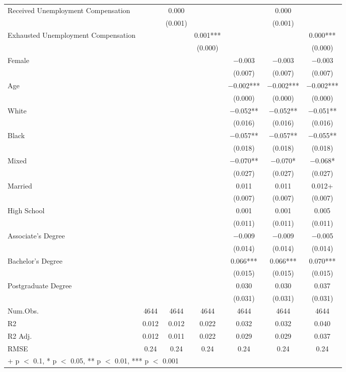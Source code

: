\documentclass[
]{article}
\begin{document}
\begin{table}
{\begin{tabular}[t]{lcccccc}
Received
Unemployment
Compensation &  & \num{0.000} &  &  & \num{0.000} & \\
 &  & (\num{0.001}) &  &  & (\num{0.001}) & \\
Exhausted
Unemployment
Compensation &  &  & \num{0.001}*** &  &  & \num{0.000}***\\
 &  &  & (\num{0.000}) &  &  & (\num{0.000})\\
Female &  &  &  & \num{-0.003} & \num{-0.003} & \num{-0.003}\\
 &  &  &  & (\num{0.007}) & (\num{0.007}) & \vphantom{1} (\num{0.007})\\
Age &  &  &  & \num{-0.002}*** & \num{-0.002}*** & \num{-0.002}***\\
 &  &  &  & (\num{0.000}) & (\num{0.000}) & (\num{0.000})\\
White &  &  &  & \num{-0.052}** & \num{-0.052}** & \num{-0.051}**\\
 &  &  &  & (\num{0.016}) & (\num{0.016}) & (\num{0.016})\\
Black &  &  &  & \num{-0.057}** & \num{-0.057}** & \num{-0.055}**\\
 &  &  &  & (\num{0.018}) & (\num{0.018}) & (\num{0.018})\\
Mixed &  &  &  & \num{-0.070}** & \num{-0.070}* & \num{-0.068}*\\
 &  &  &  & (\num{0.027}) & (\num{0.027}) & (\num{0.027})\\
Married &  &  &  & \num{0.011} & \num{0.011} & \num{0.012}+\\
 &  &  &  & (\num{0.007}) & (\num{0.007}) & (\num{0.007})\\
High
School &  &  &  & \num{0.001} & \num{0.001} & \num{0.005}\\
 &  &  &  & (\num{0.011}) & (\num{0.011}) & (\num{0.011})\\
Associate's
Degree &  &  &  & \num{-0.009} & \num{-0.009} & \num{-0.005}\\
 &  &  &  & (\num{0.014}) & (\num{0.014}) & (\num{0.014})\\
Bachelor's
Degree &  &  &  & \num{0.066}*** & \num{0.066}*** & \num{0.070}***\\
 &  &  &  & (\num{0.015}) & (\num{0.015}) & (\num{0.015})\\
Postgraduate
Degree &  &  &  & \num{0.030} & \num{0.030} & \num{0.037}\\
 &  &  &  & (\num{0.031}) & (\num{0.031}) & (\num{0.031})\\
\midrule
Num.Obs. & \num{4644} & \num{4644} & \num{4644} & \num{4644} & \num{4644} & \num{4644}\\
R2 & \num{0.012} & \num{0.012} & \num{0.022} & \num{0.032} & \num{0.032} & \num{0.040}\\
R2 Adj. & \num{0.012} & \num{0.011} & \num{0.022} & \num{0.029} & \num{0.029} & \num{0.037}\\
RMSE & \num{0.24} & \num{0.24} & \num{0.24} & \num{0.24} & \num{0.24} & \num{0.24}\\
\bottomrule
\multicolumn{7}{l}{\rule{0pt}{1em}+ p $<$ 0.1, * p $<$ 0.05, ** p $<$ 0.01, *** p $<$ 0.001}\\
\end{tabular}}
\end{table}
\end{document}
